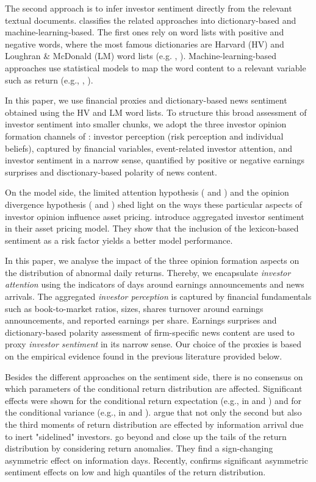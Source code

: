 \documentclass[11pt]{article}
\begin{document}
The second approach is to infer investor sentiment directly from the relevant textual documents. \cite{Su2021} classifies the related approaches into dictionary-based and machine-learning-based. The first ones rely on word lists with positive and negative words, where the most famous dictionaries  are Harvard (HV) and Loughran \& McDonald (LM) word lists (e.g. \cite{LOUGHRAN2011}, \cite{JEGADEESH2013}). Machine-learning-based approaches use statistical models to map the word content to a relevant variable such as return (e.g., \cite{Antweiler2004}, \cite{FANG2021}).

In this paper, we use financial proxies and dictionary-based news sentiment obtained using the HV and LM word lists. To structure this broad assessment of investor sentiment into smaller chunks, we adopt the three investor opinion formation channels of \cite{Su2021}: investor perception (risk perception and individual beliefs), captured by financial variables, event-related investor attention, and investor sentiment in a narrow sense, quantified by positive or negative earnings surprises and disctionary-based polarity of news content.%

On the model side, the limited attention hypothesis (\cite{corwin2008} and \cite{Loh2010}) and the opinion divergence hypothesis (\cite{BERKMAN2009} and \cite{chatterjee2012}) shed light on the ways these particular aspects of investor opinion influence asset pricing. \cite{fuess2020} introduce aggregated investor sentiment in their asset pricing model. They show that the inclusion of the lexicon-based sentiment as a risk factor yields a better model performance.

In this paper, we analyse the impact of the three opinion formation aspects on the distribution of abnormal daily returns. Thereby, we encapsulate {\it investor attention} using the indicators of days around earnings announcements and news arrivals.  The aggregated {\it investor perception} is captured by financial fundamentals such as book-to-market ratios, sizes, shares turnover around earnings announcements, and reported earnings per share. Earnings surprises and dictionary-based polarity assessment of firm-specific news content are used to proxy {\it investor sentiment} in its narrow sense. Our choice of the proxies is based on the empirical evidence found in the previous literature provided below.

Besides the different approaches on the sentiment side, there is no consensus on which parameters of the conditional return distribution are affected. Significant effects were shown for the conditional return expectation (e.g., in \cite{HAGENAU2013} and \cite{NGUYEN2015}) and for  the conditional variance (e.g., in \cite{AUDRINO2020} and \cite{FANG2021}). \cite{Cao2002} argue that not only the second but also the third moments of return distribution are effected by information arrival due to inert "sidelined" investors. \cite{ENGELBERG2018} go beyond and close up the tails of the return distribution by considering return anomalies. They find a sign-changing asymmetric effect on information days. Recently, \cite{HE2022} confirms significant asymmetric sentiment effects on low and high quantiles of the return distribution.
\end{document}
